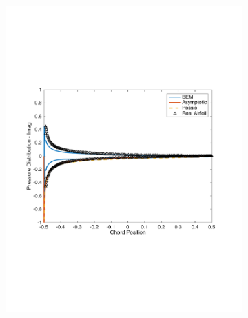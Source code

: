 \documentclass{article}
\begin{document}
\begin{figure}[h]
\begin{subfigure}{0.3\textwidth}
	\includegraphics[width = \textwidth, height=0.16\textheight]{NACA0003_pressure_k10imag}
\end{subfigure}%
\begin{subfigure}{0.33\textwidth}
	\centering

\end{subfigure}
\end{figure}
\end{document}
